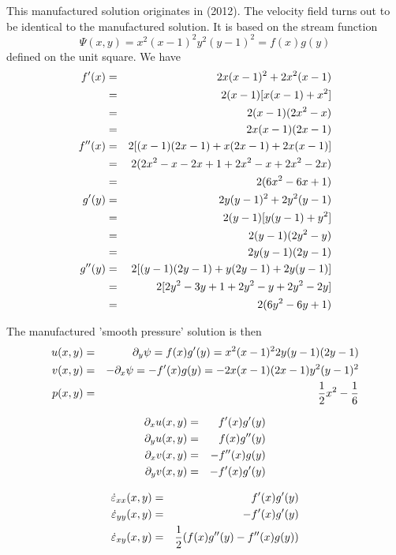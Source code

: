 This manufactured solution originates in \textcite{bocg12} (2012).
The velocity field turns out to be identical to the \textcite{dohu03} manufactured solution.
It is based on the stream function 
\[
\Psi (x,y)=x^2(x-1)^2y^2(y-1)^2 =f(x)g(y)
\]
defined on the unit square. We have 
\begin{eqnarray}
f'(x)
&=&2x(x-1)^2+2x^2(x-1) \nonumber\\
&=&2(x-1)[x(x-1)+x^2]  \nonumber\\
&=&2(x-1)(2x^2 -x)  \nonumber\\
&=&2x(x-1)(2x -1)  \nonumber\\
f''(x)
&=& 2 [ (x-1)(2x -1) + x(2x-1)+2x(x-1)] \nonumber\\
&=& 2 (2x^2 -x-2x+1 + 2x^2-x+2x^2-2x) \nonumber\\
&=& 2 (6x^2 -6x +1) \nonumber\\
g'(y)
&=& 2y (y-1)^2 + 2y^2(y-1)  \nonumber\\
&=& 2(y-1)[y(y-1)+y^2] \nonumber\\
&=& 2(y-1)(2y^2-y) \nonumber\\
&=& 2y(y-1)(2y-1) \nonumber\\
g''(y) 
&=& 2[ (y-1)(2y-1) +y(2y-1)+2y(y-1) ] \nonumber\\
&=& 2[ 2y^2 - 3y +1 +2y^2-y +2y^2-2y] \nonumber\\
&=& 2(6y^2 -6y+1)
\end{eqnarray}

The manufactured 'smooth pressure' solution is then
\begin{eqnarray}
u(x,y) &=& \partial_y \psi = f(x)g'(y) = x^2(x-1)^2 2y(y-1)(2y-1) \nonumber\\
v(x,y) &=& -\partial_x \psi = -f'(x)g(y) = -2x(x-1)(2x -1)y^2(y-1)^2 \nonumber\\
p(x,y) &=& \frac12 x^2 -\frac16 \nonumber
\end{eqnarray}

\begin{eqnarray}
\partial_x u (x,y)&=& f'(x)g'(y)\nonumber\\
\partial_y u (x,y)&=& f(x)g''(y)\nonumber\\
\partial_x v (x,y)&=& -f''(x)g(y)\nonumber\\
\partial_y v (x,y)&=& -f'(x)g'(y)\nonumber
\end{eqnarray}

\begin{eqnarray}
\dot\varepsilon_{xx}(x,y) &=& f'(x)g'(y) \nonumber\\
\dot\varepsilon_{yy}(x,y) &=&  -f'(x)g'(y) \nonumber\\
\dot\varepsilon_{xy}(x,y) &=& \frac12(f(x)g''(y)-f''(x)g(y)) \nonumber
\end{eqnarray}

